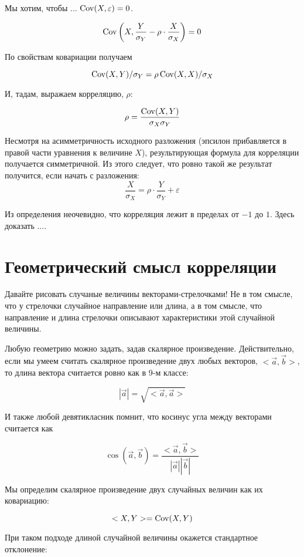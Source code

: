 \documentclass[10pt]{article}
\begin{document}
%

Мы хотим, чтобы ... $\operatorname{Cov}(X,\varepsilon)=0$. 


\[
\operatorname{Cov}\left(X, \frac{Y}{\sigma_Y} - \rho \cdot \frac{X}{\sigma_X} \right) = 0
\]

По свойствам ковариации получаем

\[
\operatorname{Cov}(X,Y)/\sigma_Y=\rho \operatorname{Cov}(X,X)/\sigma_X
\]

И, тадам, выражаем корреляцию, $\rho$:

\[
\rho = \frac{\operatorname{Cov}(X,Y)}{\sigma_X \sigma_Y}
\]

Несмотря на асимметричность исходного разложения (эпсилон прибавляется в правой части уравнения к величине $X$), результирующая формула для корреляции получается симметричной. Из этого следует, что ровно такой же результат получится, если начать с разложения:
\[
\frac{X}{\sigma_X}=\rho \cdot \frac{Y}{\sigma_Y} + \varepsilon
\]

Из определения неочевидно, что корреляция лежит в пределах от $-1$ до $1$. Здесь доказать ....



\section{Геометрический смысл корреляции}

Давайте рисовать случаные величины векторами-стрелочками! Не в том смысле, что у стрелочки случайное направление или длина, а в том смысле, что направление и длина стрелочки описывают характеристики этой случайной величины. 

Любую геометрию можно задать, задав скалярное произведение. Действительно, если мы умеем считать скалярное произведение двух любых векторов, $<\vec{a},\vec{b}>$, то длина вектора считается ровно как в 9-м классе:

\[
|\vec{a}|=\sqrt{<\vec{a},\vec{a}>}
\]

И также любой девятикласник помнит, что косинус угла между векторами считается как

\[
\cos(\vec{a},\vec{b})=\frac{<\vec{a},\vec{b}>}{|\vec{a}||\vec{b}|}
\]

Мы определим скалярное произведение двух случайных величин как их ковариацию:

\[
<X,Y>=\operatorname{Cov}(X,Y)
\]

При таком подходе длиной случайной величины окажется стандартное отклонение:
\end{document}
